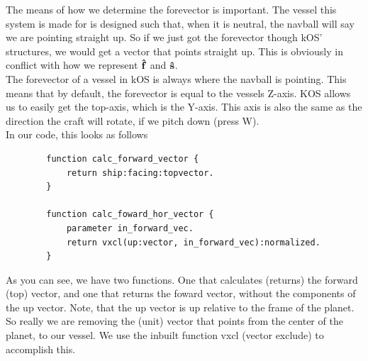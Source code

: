 \documentclass[11pt]{article}
\begin{document}
    The means of how we determine the forevector is important.
    The vessel this system is made for is designed such that, when it is neutral, the navball will say we are pointing straight up. 
    So if we just got the forevector though kOS' structures, we would get a vector that points straight up. 
    This is obviously in conflict with how we represent $\vu{f}$ and $\vu{s}$.\\

    The forevector of a vessel in kOS is always where the navball is pointing.
    This means that by default, the forevector is equal to the vessels Z-axis. 
    KOS allows us to easily get the top-axis, which is the Y-axis. 
    This axis is also the same as the direction the craft will rotate, if we pitch down (press W).\\
    
    In our code, this looks as follows
    \begin{verbatim}
        function calc_forward_vector {
            return ship:facing:topvector.
        }

        function calc_foward_hor_vector {
            parameter in_forward_vec.
            return vxcl(up:vector, in_forward_vec):normalized.
        }
    \end{verbatim}

    As you can see, we have two functions.
    One that calculates (returns) the forward (top) vector, and one that returns the foward vector, without the components of the up vector.
    Note, that the up vector is up relative to the frame of the planet. 
    So really we are removing the (unit) vector that points from the center of the planet, to our vessel.
    We use the inbuilt function vxcl (vector exclude) to accomplish this. \\
\end{document}
